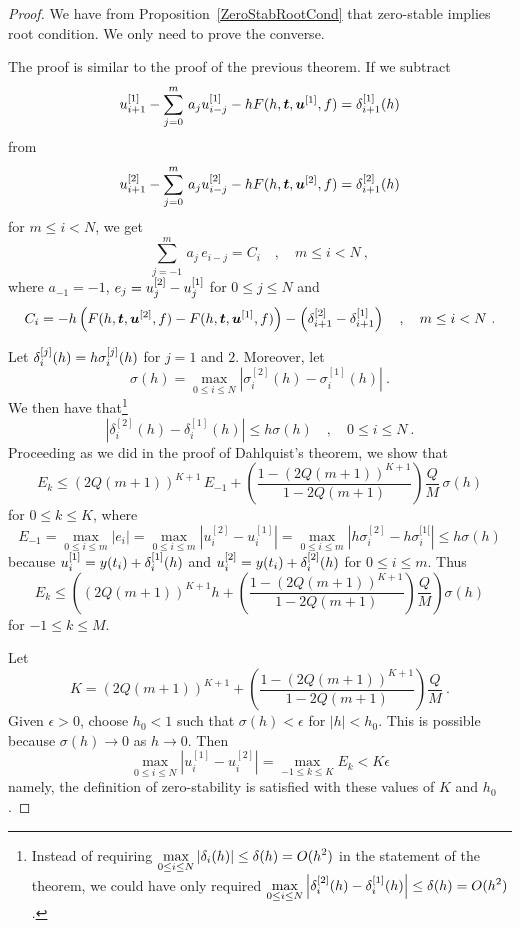 \begin{proof}
We have from Proposition~\ref{ZeroStabRootCond} that zero-stable implies
root condition.  We only need to prove the converse.

The proof is similar to the proof of the previous theorem.
If we subtract
\[
u_{i+1}^{[1]} - \sum_{j=0}^m\,a_j u_{i-j}^{[1]} - h
F(h,\bm{t},\bm{u}^{[1]},f) = \delta_{i+1}^{[1]}(h)
\]
from
\[
u_{i+1}^{[2]} - \sum_{j=0}^m\,a_j u_{i-j}^{[2]} - h
F(h,\bm{t},\bm{u}^{[2]},f) = \delta_{i+1}^{[2]}(h)
\]
for $m \leq i < N$, we get
\[
\sum_{j=-1}^m\,a_j\,e_{i-j} = C_i \quad , \quad  m \leq i < N \ ,
\]
where $a_{-1} = -1$, $\displaystyle e_j = u_j^{[2]} - u_j^{[1]}$ for
$0 \leq j \leq N$ and
\[
C_i = -h \left( F(h,\bm{t},\bm{u}^{[2]},f)
- F(h,\bm{t},\bm{u}^{[1]},f) \right) -
\left( \delta_{i+1}^{[2]}- \delta_{i+1}^{[1]} \right)
\quad , \quad m \leq i < N \ .
\]

Let $\displaystyle \delta_i^{[j]}(h) = h \sigma_i^{[j]}(h)$ for $j=1$ and $2$.
Moreover, let
\[
\sigma(h) = \max_{0\leq i \leq N} \left|\sigma_i^{[2]}(h)
- \sigma_i^{[1]}(h)\right| \ .
\]
We then have that\footnote{Instead of requiring
$\displaystyle \max_{0 \leq i \leq N} | \delta_i(h) | \leq
\delta(h) = O(h^2)$ in the statement of the theorem, we could have only
required
$\displaystyle \max_{0 \leq i \leq N}
\left| \delta_i^{[2]}(h) - \delta_i^{[1]}(h) \right| \leq
\delta(h) = O(h^2)$.}
\[
  \left| \delta_i^{[2]}(h) - \delta_i^{[1]}(h) \right| \leq h \sigma(h)
\quad , \quad 0 \leq i \leq N \ .
\]
Proceeding as we did in the proof of Dahlquist's theorem, we show that
\[
E_k \leq
(2Q(m+1))^{K+1}\,E_{-1} + \left(\frac{1-(2Q(m+1))^{K+1}}{1-2Q(m+1)}\right)
\frac{Q}{M}\,\sigma(h)
\]
for $0\leq k \leq K$, where
\[
E_{-1} = \max_{0 \leq i \leq m} \left| e_i\right|
= \max_{0 \leq i \leq m} \left| u_i^{[2]}- u_i^{[1]} \right|
= \max_{0 \leq i \leq m} \left| h\sigma_i^{[2]} - h \sigma_i^{[1[} \right|
\leq h \sigma(h)
\]
because $\displaystyle u_i^{[1]} = y(t_i) + \delta_i^{[1]}(h)$ and
$\displaystyle u_i^{[2]} = y(t_i) + \delta_i^{[2]}(h)$ for
$0\leq i \leq m$.  Thus
\[
E_k \leq \left(
(2Q(m+1))^{K+1}h + \left(\frac{1-(2Q(m+1))^{K+1}}{1-2Q(m+1)}\right)
\frac{Q}{M}\right) \sigma(h)
\]
for $-1 \leq k \leq M$.

Let
\[
  K = (2Q(m+1))^{K+1} + \left(\frac{1-(2Q(m+1))^{K+1}}{1-2Q(m+1)}\right)
  \frac{Q}{M} \ .
\]
Given $\epsilon >0$, choose $h_0<1$ such that
$\sigma(h) < \epsilon$ for $|h|<h_0$.  This is possible because
$\sigma(h) \to 0$ as $h \to 0$.  Then
\[
\max_{0\leq i \leq N} | u_i^{[1]} - u_i^{[2]} |
= \max_{-1\leq k \leq K} E_k < K \epsilon
\]
namely, the definition of zero-stability is satisfied with these values
of $K$ and $h_0$. 
\end{proof}

